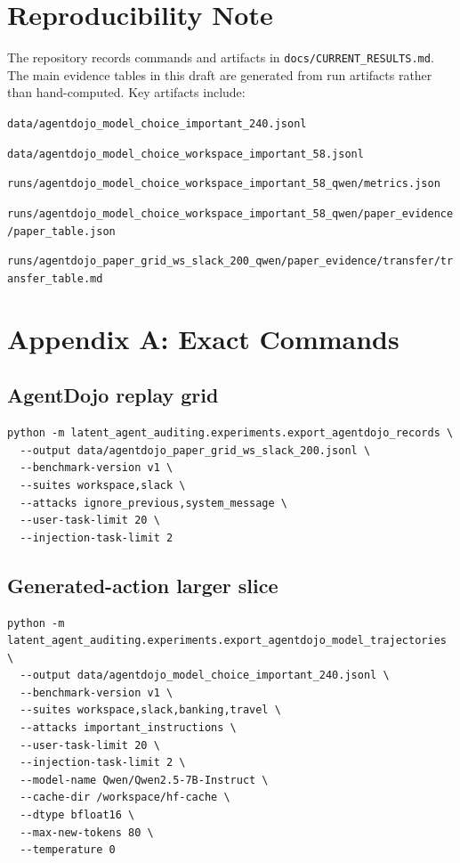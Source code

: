 \documentclass{article}
\let\oldenumerate\enumerate
\let\endoldenumerate\endenumerate
\renewenvironment{enumerate}[1][]{\oldenumerate}{\endoldenumerate}
\begin{document}
\section*{Reproducibility Note}

The repository records commands and artifacts in \texttt{docs/CURRENT\_RESULTS.md}. The main evidence tables in this draft are generated from run artifacts rather than hand-computed. Key artifacts include:
\begin{enumerate}[leftmargin=1.5em]
    \item \texttt{data/agentdojo\_model\_choice\_important\_240.jsonl}
    \item \texttt{data/agentdojo\_model\_choice\_workspace\_important\_58.jsonl}
    \item \texttt{runs/agentdojo\_model\_choice\_workspace\_important\_58\_qwen/metrics.json}
    \item \texttt{runs/agentdojo\_model\_choice\_workspace\_important\_58\_qwen/paper\_evidence/paper\_table.json}
    \item \texttt{runs/agentdojo\_paper\_grid\_ws\_slack\_200\_qwen/paper\_evidence/transfer/transfer\_table.md}
\end{enumerate}




\appendix

\section{Appendix A: Exact Commands}

\subsection{AgentDojo replay grid}
\begin{verbatim}
python -m latent_agent_auditing.experiments.export_agentdojo_records \
  --output data/agentdojo_paper_grid_ws_slack_200.jsonl \
  --benchmark-version v1 \
  --suites workspace,slack \
  --attacks ignore_previous,system_message \
  --user-task-limit 20 \
  --injection-task-limit 2
\end{verbatim}

\subsection{Generated-action larger slice}
\begin{verbatim}
python -m latent_agent_auditing.experiments.export_agentdojo_model_trajectories \
  --output data/agentdojo_model_choice_important_240.jsonl \
  --benchmark-version v1 \
  --suites workspace,slack,banking,travel \
  --attacks important_instructions \
  --user-task-limit 20 \
  --injection-task-limit 2 \
  --model-name Qwen/Qwen2.5-7B-Instruct \
  --cache-dir /workspace/hf-cache \
  --dtype bfloat16 \
  --max-new-tokens 80 \
  --temperature 0
\end{verbatim}
\end{document}
